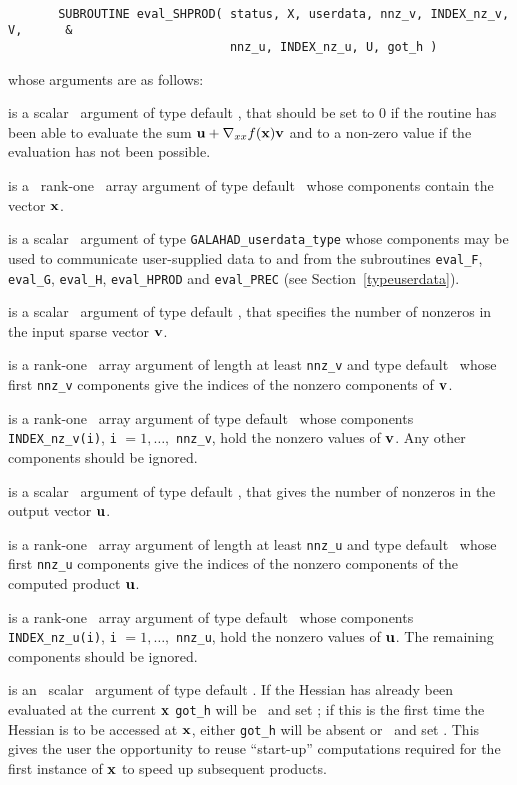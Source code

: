 \documentclass{galahad}
\begin{document}
\def\baselinestretch{0.8}
{\tt
\begin{verbatim}
       SUBROUTINE eval_SHPROD( status, X, userdata, nnz_v, INDEX_nz_v, V,      &
                               nnz_u, INDEX_nz_u, U, got_h )
\end{verbatim} }
\def\baselinestretch{1.0}
\noindent whose arguments are as follows:

\begin{description}
 is a scalar \intentout\ argument of type default \integer,
that should be set to 0 if the routine has been able to evaluate the
sum ${\mathbf{u}} + \nabla_{xx} f({\mathbf{x}}) {\mathbf{v}}$
and to a non-zero value if the evaluation has not been possible.

 is a \ rank-one \intentin\ array argument of type
default \realdp\ whose components contain the vector ${\mathbf{x}}$.

 is a scalar \intentinout\ argument of type
{\tt GALAHAD\_userdata\_type} whose components may be used
to communicate user-supplied data to and from the
subroutines {\tt eval\_F}, {\tt eval\_G},
{\tt eval\_H}, {\tt eval\_HPROD} and {\tt eval\_PREC}
(see Section~\ref{typeuserdata}).

 is a scalar \intentin\ argument of type default \integer,
that specifies the number of nonzeros in the input sparse vector
${\mathbf{v}}$.

 is a rank-one \intentin\ array argument of length 
at least {\tt nnz\_v} and type default \integer\ 
whose first {\tt nnz\_v} components 
give the indices of the nonzero components of ${\mathbf{v}}$.

 is a rank-one \intentin\ array argument of type default \realdp\
whose components {\tt INDEX\_nz\_v(i)}, {\tt i} $= 1, \ldots,$ {\tt nnz\_v},
hold the nonzero values of ${\mathbf{v}}$. Any other components should be ignored.

\itt{nnz\_u} is a scalar \intentout\ argument of type default \integer,
that gives the number of nonzeros in the output vector ${\mathbf{u}}$.

 is a rank-one \intentout\ array argument of length 
at least {\tt nnz\_u} and type default \integer\ 
whose first {\tt nnz\_u} components give the indices of the 
nonzero components of the computed product ${\mathbf{u}}$.

\ittf{U} is a rank-one \intentout\ array argument of type default \realdp\
whose components {\tt INDEX\_nz\_u(i)}, {\tt i} $= 1, \ldots,$ {\tt nnz\_u},
hold the nonzero values of ${\mathbf{u}}$. The remaining components should be ignored.

\ittf{got\_h} is an \optional\ scalar \intentin\ argument of type default
\logical. If the Hessian has already been evaluated at the current ${\mathbf{x}}$
{\tt got\_h} will be \present\ and set \true; if this is the first time
the Hessian is to be accessed at ${\mathbf{x}}$, either {\tt got\_h} will be absent
or \present\ and set \false. This gives the user the opportunity
to reuse ``start-up'' computations required for the first instance of
${\mathbf{x}}$ to speed up subsequent products.

\end{description}
\end{document}
